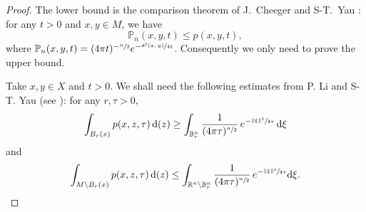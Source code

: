 \documentclass[10pt]{amsart}
\newcommand{\NoChangel}[1]{%
\expandafter\let\csname old\string#1\endcsname=#1
\let#1=\relax
\newcommand{#1}{\mathcode`l="716C\csname old\string#1\endcsname\mathcode`l="7160 }%
}
\theoremstyle{plain}
\theoremstyle{definition}
\newcommand{\setR}{\mathbb{R}}
\newcommand{\bP}{\mathbb{P}}
\newcommand{\di}{\mathop{}\!\mathrm{d}}
\DeclareMathOperator{\vol}{vol}\NoChangel{\vol}
\begin{document}
\begin{proof}
The lower bound is the comparison theorem of J.~Cheeger and S-T.~Yau \cite{CheegerYau}: for any $t>0$ and $x,y\in M$, we have
\begin{equation}\label{eq:CheegerYau}\bP_n(x,y,t)\le p(x,y,t),\end{equation}
where
$\bP_n(x,y,t)=(4\pi t)^{-\sfrac n2}e^{-\sfrac{d^2(x,y)}{4t}}$. Consequently we only need to prove the upper bound.

Take $x,y \in X$ and $t>0$. We shall need the following estimates from P. Li and S-T. Yau (see \cite[Form.\,(2.1)]{LiTamWang}): for any $r,\tau>0$,
\begin{equation}\label{eq:LY1}\int_{B_r(x)}p(x,z,\tau)\di\vol(z)\ge \int_{\mathbb{B}^n_r}\frac{1}{(4\pi \tau)^{\sfrac n2}}\,e^{-\sfrac{\|\xi\|^2}{4\tau}}\di \xi
\end{equation}
and
\begin{equation}\label{eq:LY2}
\int_{M\setminus B_r(x)}p(x,z,\tau)\di \vol(z)\le \int_{\setR^n\setminus \mathbb{B}_r^n}\frac{1}{(4\pi \tau)^{\sfrac n2}}\,e^{-\sfrac{\|\xi\|^2}{4\tau}}\mathrm{\di}\xi.
\end{equation}


\end{proof}
\end{document}
